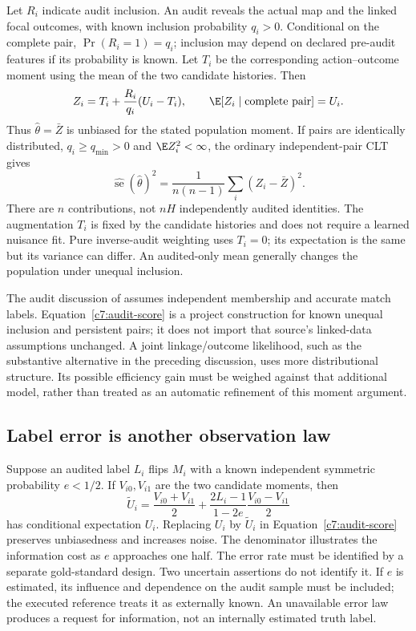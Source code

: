 Let $R_i$ indicate audit inclusion. An audit reveals the actual map and the
linked focal outcomes, with known inclusion probability $q_i>0$. Conditional
on the complete pair, $\Pr(R_i=1)=q_i$; inclusion may depend on declared
pre-audit features if its probability is known. Let $T_i$ be the corresponding
action--outcome moment using the mean of the two candidate histories. Then
\begin{equation}
 Z_i=T_i+\frac{R_i}{q_i}(U_i-T_i),\qquad
 \E[Z_i\mid\text{complete pair}]=U_i.
 \label{c7:audit-score}
\end{equation}
Thus $\widehat\theta=\bar Z$ is unbiased for the stated population moment.
If pairs are identically distributed, $q_i\ge q_{\min}>0$ and
$\E Z_i^2<\infty$, the ordinary independent-pair CLT gives
\[
 \widehat{\operatorname{se}}(\widehat\theta)^2
   =\frac{1}{n(n-1)}\sum_i(Z_i-\bar Z)^2.
\]
There are $n$ contributions, not $nH$ independently audited identities.
The augmentation $T_i$ is fixed by the candidate histories and does not
require a learned nuisance fit. Pure inverse-audit weighting uses $T_i=0$;
its expectation is the same but its variance can differ. An audited-only
mean generally changes the population under unequal inclusion.

The audit discussion of \citet[Section 2.1]{slawski2025} assumes independent
membership and accurate match labels. Equation~\eqref{c7:audit-score} is a
project construction for known unequal inclusion and persistent pairs; it
does not import that source's linked-data assumptions unchanged. A joint
linkage/outcome likelihood, such as the substantive alternative in the
preceding discussion, uses more distributional structure. Its possible
efficiency gain must be weighed against that additional model, rather than
treated as an automatic refinement of this moment argument.

\subsection{Label error is another observation law}
Suppose an audited label $L_i$ flips $M_i$ with a known independent symmetric
probability $e<1/2$. If $V_{i0},V_{i1}$ are the two candidate moments, then
\[
 \widetilde U_i=\frac{V_{i0}+V_{i1}}2+
       \frac{2L_i-1}{1-2e}\frac{V_{i0}-V_{i1}}2
\]
has conditional expectation $U_i$. Replacing $U_i$ by $\widetilde U_i$ in
Equation~\eqref{c7:audit-score} preserves unbiasedness and increases noise.
The denominator illustrates the information cost as $e$ approaches one half.
The error rate must be identified by a separate gold-standard design. Two
uncertain assertions do not identify it. If $e$ is estimated, its influence
and dependence on the audit sample must be included; the executed reference
treats it as externally known. An unavailable error law produces a request
for information, not an internally estimated truth label.

